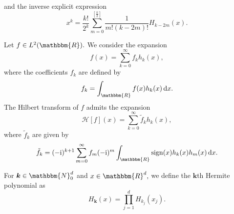 \documentclass[a4paper,twoside,10pt]{article}
\theoremstyle{break}
\theoremstyle{nonumberplain}
\newcommand{\R}{\mathbbm{R}}
\newcommand{\N}{\mathbbm{N}}
\renewcommand{\b}{\bm}
\renewcommand{\i}{\mathrm i}
\renewcommand{\d}{\,\mathrm d}
\DeclareMathOperator{\sign}{sign}
\begin{document}
and the inverse explicit expression
\begin{equation}\label{her_inv}
x^k = \frac{k!}{2^k}\sum_{m=0}^{\left[ \tfrac{k}{2}\right] } \frac{1}{m!(k-2m)!} H_{k-2m} (x) .
\end{equation}

Let $f \in L^2 (\R).$ We consider the expansion 
\begin{equation*}%
f(x) = \sum_{k=0}^\infty f_k h_k (x) ,
\end{equation*}
where the coefficients $f_k$ are defined by
\begin{equation*}%
f_k = \int_\R f(x) h_k (x) \d x .
\end{equation*}
The Hilbert transform of $f$ admits the expansion 
\begin{equation}\label{her_hil}
\mathcal{H} [f] (x) = \sum_{k=0}^\infty \tilde f_k h_k (x) ,
\end{equation}
where $\tilde f_k$ are given by \cite{PorSchuKin13}
\begin{equation}\label{her_coe_hil}
\tilde f_k  = (-\i)^{k+1} \sum_{m=0}^\infty f_m (-\i)^m \int_\R \sign (x) h_k (x) h_m (x) \d x .
\end{equation}

For $\b k \in \N_0^d$ and $ x \in \R^d,$ we define the $\b k$th Hermite polynomial as
\begin{equation}\label{her_3d}
H_{\b k} ( x) = \prod_{j=1}^{d} H_{k_j} (x_j) . 
\end{equation}
\end{document}
